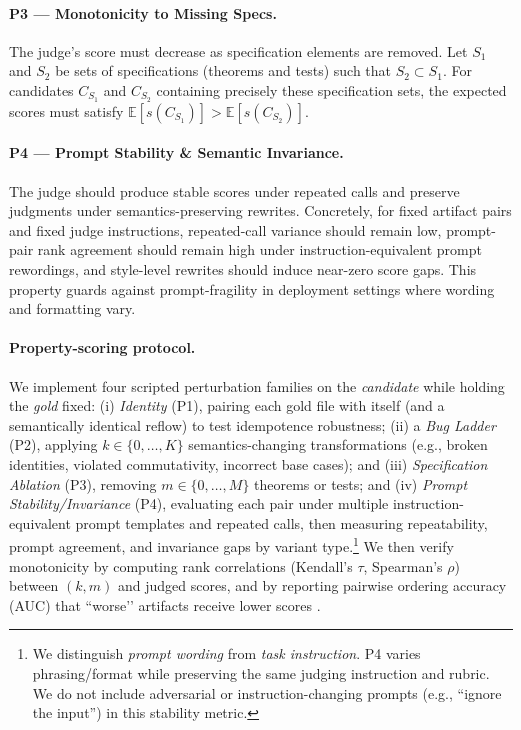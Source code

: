 \documentclass{article}
\begin{document}
\paragraph{P3 — Monotonicity to Missing Specs.}
The judge’s score must decrease as specification elements are removed.
Let $S_1$ and $S_2$ be sets of specifications (theorems and tests) such that $S_2 \subset S_1$.
For candidates $C_{S_1}$ and $C_{S_2}$ containing precisely these specification sets, the expected scores must satisfy $\mathbb{E}[s(C_{S_1})] > \mathbb{E}[s(C_{S_2})]$.

\paragraph{P4 — Prompt Stability \& Semantic Invariance.}
The judge should produce stable scores under repeated calls and preserve judgments under semantics-preserving rewrites.
Concretely, for fixed artifact pairs and fixed judge instructions, repeated-call variance should remain low, prompt-pair rank agreement should remain high under instruction-equivalent prompt rewordings, and style-level rewrites should induce near-zero score gaps.
This property guards against prompt-fragility in deployment settings where wording and formatting vary.

\paragraph{Property-scoring protocol.}
We implement four scripted perturbation families on the \emph{candidate} while holding the \emph{gold} fixed:
(i) \emph{Identity} (P1), pairing each gold file with itself (and a semantically identical reflow) to test idempotence robustness;
(ii) a \emph{Bug Ladder} (P2), applying $k\!\in\!\{0,\ldots,K\}$ semantics-changing transformations (e.g., broken identities, violated commutativity, incorrect base cases); and
(iii) \emph{Specification Ablation} (P3), removing $m\!\in\!\{0,\ldots,M\}$ theorems or tests; and
(iv) \emph{Prompt Stability/Invariance} (P4), evaluating each pair under multiple instruction-equivalent prompt templates and repeated calls, then measuring repeatability, prompt agreement, and invariance gaps by variant type.\footnote{We distinguish \emph{prompt wording} from \emph{task instruction}. P4 varies phrasing/format while preserving the same judging instruction and rubric. We do not include adversarial or instruction-changing prompts (e.g., ``ignore the input'') in this stability metric.}
We then verify monotonicity by computing rank correlations (Kendall’s $\tau$, Spearman’s $\rho$) between $(k,m)$ and judged scores, and by reporting pairwise ordering accuracy (AUC) that “worse’’ artifacts receive lower scores \citep{TongZhang2024CodeJudge,Zhuo2024ICEScore}.
\end{document}

